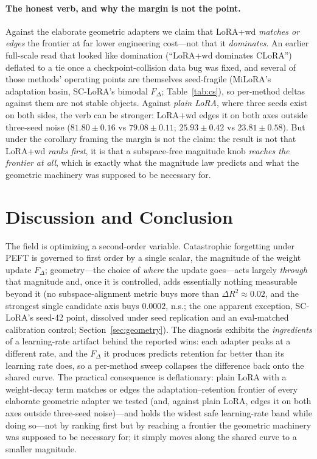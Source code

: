 \documentclass[11pt]{article}
\newcommand{\dw}{F_{\Delta}}
\begin{document}
\paragraph{The honest verb, and why the margin is not the point.} Against the
elaborate geometric adapters we claim that
LoRA{+}wd \emph{matches or edges} the frontier at far lower engineering cost---not
that it \emph{dominates}. An earlier full-scale read that looked like domination
(``LoRA{+}wd dominates CLoRA'') deflated to a tie once a checkpoint-collision data
bug was fixed, and several of those methods' operating points are themselves
seed-fragile (MiLoRA's adaptation basin, SC-LoRA's bimodal $\dw$;
Table~\ref{tab:cs}), so per-method deltas against them are not stable objects.
Against \emph{plain LoRA}, where three seeds exist on both sides, the verb can be
stronger: LoRA{+}wd edges it on both axes outside three-seed noise
($81.80\!\pm\!0.16$ vs $79.08\!\pm\!0.11$; $25.93\!\pm\!0.42$ vs
$23.81\!\pm\!0.58$). But under the corollary framing the margin is not the
claim: the result is not that LoRA{+}wd \emph{ranks first}, it is that a
subspace-free magnitude knob \emph{reaches the frontier at all}, which is exactly
what the magnitude law predicts and what the geometric machinery was supposed to be
necessary for.

\section{Discussion and Conclusion}\label{sec:conclusion}
The field is optimizing a second-order variable. Catastrophic forgetting under PEFT
is governed to first order by a single scalar, the magnitude of the weight update
$\dw$; geometry---the choice of \emph{where} the update goes---acts largely
\emph{through} that magnitude and, once it is controlled, adds essentially nothing
measurable beyond it (no subspace-alignment metric buys more than
$\Delta R^2\!\approx\!0.02$, and the strongest single candidate axis buys
$0.0002$, n.s.; the one apparent exception, SC-LoRA's seed-42 point, dissolved
under seed replication and an eval-matched calibration control;
Section~\ref{sec:geometry}). The diagnosis exhibits the
\emph{ingredients} of a learning-rate artifact behind the reported wins: each
adapter peaks at a different rate, and the $\dw$ it produces predicts retention
far better than its learning rate does, so a per-method sweep collapses the
difference back onto the shared curve. The practical consequence is deflationary:
plain LoRA with a weight-decay term matches or edges the adaptation--retention
frontier of every elaborate geometric adapter we tested (and, against plain LoRA,
edges it on both axes outside three-seed noise)---and holds the widest
safe learning-rate band while doing so---not by ranking first but by reaching a
frontier the geometric machinery was supposed to be necessary for; it simply moves
along the shared curve to a smaller magnitude.
\end{document}
